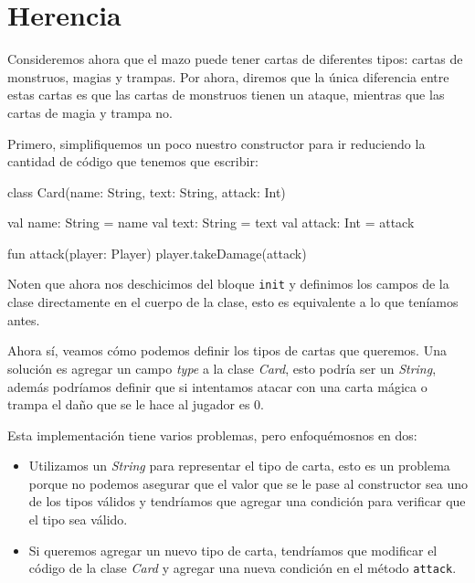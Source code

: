 \section{Herencia}
  Consideremos ahora que el mazo puede tener cartas de diferentes tipos: cartas de monstruos, 
  magias y trampas.
  Por ahora, diremos que la única diferencia entre estas cartas es que las cartas de monstruos
  tienen un ataque, mientras que las cartas de magia y trampa no.

  Primero, simplifiquemos un poco nuestro constructor para ir reduciendo la cantidad de código que
  tenemos que escribir:

  \begin{kotlin}
    class Card(name: String, text: String, attack: Int) {
      val name: String = name
      val text: String = text
      val attack: Int = attack
      
      fun attack(player: Player) {
        player.takeDamage(attack)
      }
    }
  \end{kotlin}

  Noten que ahora nos deschicimos del bloque \texttt{init} y definimos los campos de la clase
  directamente en el cuerpo de la clase, esto es equivalente a lo que teníamos antes.

  Ahora sí, veamos cómo podemos definir los tipos de cartas que queremos.
  Una solución es agregar un campo \textit{type} a la clase \textit{Card}, esto podría ser un 
  \textit{String}, además podríamos definir que si intentamos atacar con una carta mágica o trampa
  el daño que se le hace al jugador es 0.


  Esta implementación tiene varios problemas, pero enfoquémosnos en dos:

  \begin{itemize}
    \item Utilizamos un \textit{String} para representar el tipo de carta, esto es un problema 
      porque no podemos asegurar que el valor que se le pase al constructor sea uno de los tipos
      válidos y tendríamos que agregar una condición para verificar que el tipo sea válido.
    \item Si queremos agregar un nuevo tipo de carta, tendríamos que modificar el código de la
      clase \textit{Card} y agregar una nueva condición en el método \texttt{attack}.
  \end{itemize}

